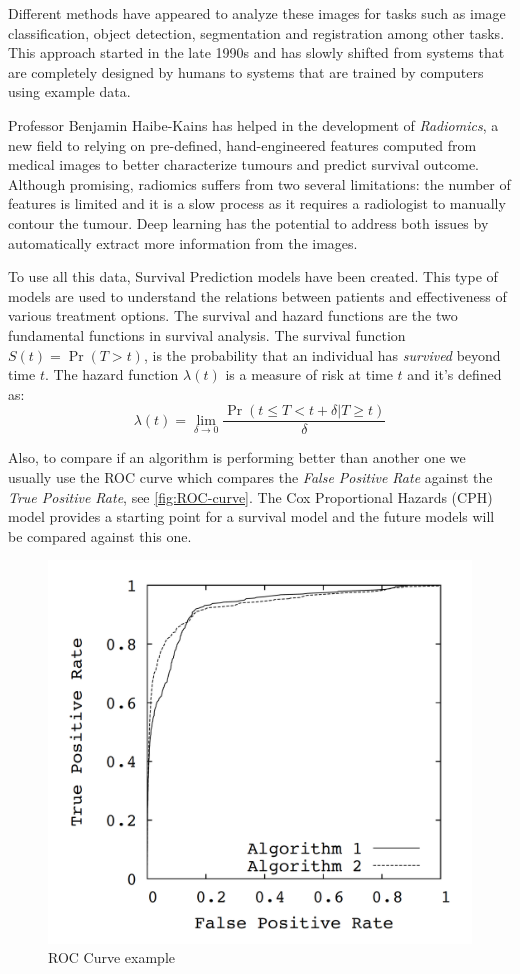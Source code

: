 \documentclass[a4paper, 12pt]{article}
\begin{document}
Different methods have appeared to analyze these images for tasks such as
image classification, object detection, segmentation and registration among other tasks. This
approach started in the late 1990s and has slowly shifted from systems that are completely designed
by humans to systems that are trained by computers using example data. 
~\cite{survey-deep-learning}

Professor Benjamin Haibe-Kains has helped in the development of \emph{Radiomics}, a new field to
relying on pre-defined, hand-engineered features computed from medical images to better 
characterize tumours and predict survival outcome. Although promising, radiomics suffers from 
two several limitations: the number of features is limited and it is a slow process as it requires
a radiologist to manually contour the tumour. Deep learning has the potential to address both issues
by automatically extract more information from the images.
~\cite{radiomics-ML-classifiers}

To use all this data, Survival Prediction models have been created. This type of models are
used to understand the relations between patients and effectiveness of various treatment options. 
The survival and hazard functions are the two fundamental functions in survival analysis. The
survival function \( S(t) = \Pr(T > t) \), is the probability that an individual has
\emph{survived} beyond time \( t \). The hazard function \( \lambda(t) \) is a measure of risk at 
time \( t \) and it's defined as:
~\cite{DeepSurv}
\[
    \lambda(t) = \lim_{\delta \rightarrow 0}
    \frac{\Pr(t \le T < t + \delta | T \ge t)}{\delta}
\]


Also, to compare if an algorithm is performing better than another one we usually use the ROC curve
which compares the \emph{False Positive Rate} against the \emph{True Positive Rate}, see 
\autoref{fig:ROC-curve}. The Cox Proportional Hazards (CPH) model provides a starting point for a 
survival model and the future models will be compared against this one.
~\cites{ROC-precision-recall}{Cox}

\begin{figure}
    \centering
    \includegraphics[width=.5\linewidth]{images/roc_curve}
    \caption{ROC Curve example\label{fig:ROC-curve}}
\end{figure}
\end{document}
